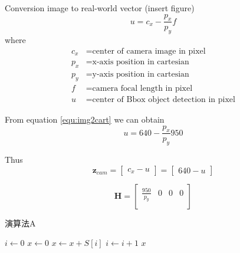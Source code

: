 Conversion image to real-world vector (insert figure)
\begin{equation}\label{equ:img2cart}
u=c_x-\frac{p_x}{p_y}f
\end{equation}
where
\begin{align*}
    c_x &=\text{center of camera image in pixel}\\
    p_x &=\text{x-axis position in cartesian}\\
    p_y &=\text{y-axis position in cartesian}\\
    f &=\text{camera focal length in pixel}\\
    u &=\text{center of Bbox object detection in pixel}
\end{align*}

From equation \ref{equ:img2cart} we can obtain
\begin{equation}\label{equ:2_img2cart2}
    u=640-\frac{p_x}{p_y}950
\end{equation}

Thus
\begin{equation}\label{equ:2_z_cam}
    \mathbf{z}_{cam}=
    \begin{bmatrix}c_x-u\end{bmatrix}=
    \begin{bmatrix}640-u\end{bmatrix}
\end{equation}

\begin{equation}\label{equ:2_cam_transition_matrix}
    \mathbf{H} = 
    \begin{bmatrix}
        \frac{950}{p_y} & 0 & 0 & 0 \\
      \end{bmatrix}
\end{equation}



\begin{algorithm}[htbp]
    \SetAlgoNoLine

    \caption{演算法A}
    \label{algo:algoexample}



    \AlgoHRule

    $i \gets 0$\;
    $x \gets 0$\;
    \;
    {
        $x \gets x + S[i]$\;
        $i  \gets i + 1$\;
    }
    \BlankLine
    \Return $x$\;
\end{algorithm}